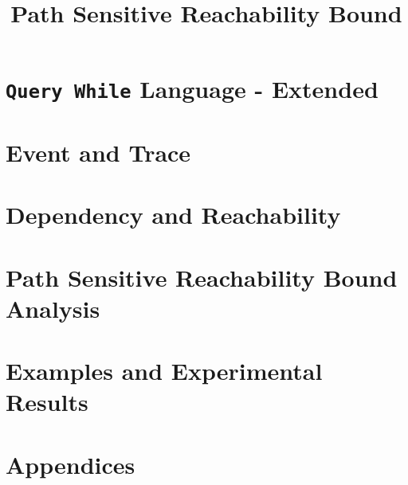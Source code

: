 \documentclass[a4paper,11pt]{article}
\newcommand{\highlight}[1]{\textcolor[rgb]{.0,0.0,1.0}{ #1}}
\begin{document}
\title{Path Sensitive Reachability Bound}

\author{}

\date{}

\maketitle
%
\tableofcontents

% 
\section{\highlight{{\tt Query While} Language - Extended}}
\label{sec:language}

\clearpage
\section{Event and Trace}
\label{sec:event_trace}


\clearpage
\section{\highlight{Dependency and Reachability}}
\label{sec:adapt}

\clearpage
\section{Path Sensitive Reachability Bound Analysis}
\label{sec:adpfun}



\clearpage
%
\section{Examples and Experimental Results}

%
\clearpage
\appendix
{}
\section*{Appendices}

\end{document}
